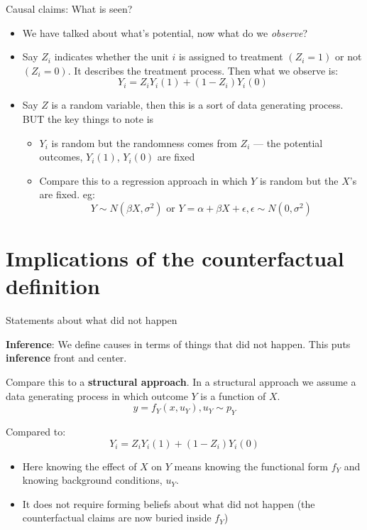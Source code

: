 \documentclass[11pt,ignorenonframetext,]{beamer}
\providecommand{\tightlist}{%
  \setlength{\itemsep}{0pt}\setlength{\parskip}{0pt}}
\begin{document}
\begin{frame}{Causal claims: What is seen?}

\begin{itemize}
    \item We have talked about what's potential, now what {do} we \textit{observe}? 
    \item Say $Z_i$ indicates whether the unit $i$ is assigned to treatment $(Z_i=1)$ or not $(Z_i=0)$. It describes the treatment process. Then what we observe is:
    $$ Y_i = Z_iY_i(1) + (1-Z_i)Y_i(0) $$

\item Say $Z$ is a random variable, then this is a sort of data generating process. BUT the key things to note is   
\begin{itemize}
    \item   $Y_i$ is random but the randomness comes from $Z_i$ --- the potential outcomes, $Y_i(1)$, $Y_i(0)$ are fixed 
    \item Compare this to a regression approach in which $Y$ is random but the $X$'s are fixed. eg:
    $$ Y \sim N(\beta X, \sigma^2) \text{ or }  Y=\alpha+\beta X+\epsilon, \epsilon\sim N(0, \sigma^2) $$
\end{itemize}
\end{itemize}

\end{frame}

\section{Implications of the counterfactual
definition}\label{implications-of-the-counterfactual-definition}

\begin{frame}{Statements about what did not happen}

\textbf{Inference}: We define causes in terms of things that did not
happen. This puts \textbf{inference} front and center.

Compare this to a \textbf{structural approach}. In a structural approach
we assume a data generating process in which outcome \(Y\) is a function
of \(X\). \[y = f_Y(x, u_Y), u_Y\sim p_Y\]

Compared to: \[ Y_i = Z_iY_i(1) + (1-Z_i)Y_i(0) \]

\begin{itemize}
\tightlist
\item
  Here knowing the effect of \(X\) on \(Y\) means knowing the functional
  form \(f_Y\) and knowing background conditions, \(u_Y\).
\item
  It does not require forming beliefs about what did not happen (the
  counterfactual claims are now buried inside \(f_Y\))
\end{itemize}

\end{frame}
\end{document}
